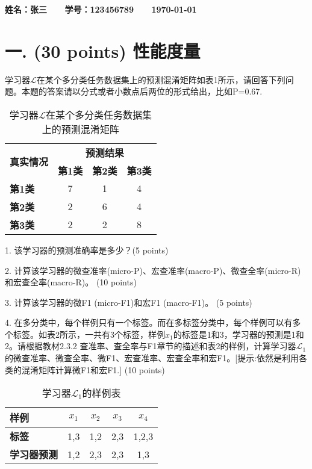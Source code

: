 \documentclass[8pt]{article}
\begin{document}
\textbf{\color{blue} \Large 姓名：张三 \ \ \ 学号：123456789 \ \ \ \today}


\section*{一. (30 points) 性能度量}
学习器$\mathcal{L}$在某个多分类任务数据集上的预测混淆矩阵如表1所示，请回答下列问题。本题的答案请以分式或者小数点后两位的形式给出，比如P=0.67.
\begin{table}[h]
\centering
\begin{tabular}{l|c|c|c}
\toprule
\multirow{2}{*}{\textbf{真实情况}}  & \multicolumn{3}{c}{\textbf{预测结果}} \\
\cmidrule(lr){2-4} & \textbf{第1类} & \textbf{第2类} & \textbf{第3类}\\
\midrule
\textbf{第1类}& 7 & 1 & 4\\
\midrule
\textbf{第2类}& 2 & 6 & 4  \\
\midrule
\textbf{第3类} &2  & 2 & 8 \\
\bottomrule
\end{tabular}
\caption{学习器$\mathcal{L}$在某个多分类任务数据集上的预测混淆矩阵}
\end{table}

1. 该学习器的预测准确率是多少？(5 points)

2. 计算该学习器的微查准率(micro-P)、宏查准率(macro-P)、微查全率(micro-R) 和宏查全率(macro-R)。 (10 points)

3. 计算该学习器的微F1 (micro-F1)和宏F1 (macro-F1)。 (5 points)

4. 在多分类中，每个样例只有一个标签。而在多标签分类中，每个样例可以有多个标签。如表2所示，一共有3个标签，样例$x_1$的标签是1和3，学习器的预测是1和2。请根据教材2.3.2 查准率、查全率与F1章节的描述和表2的样例，计算学习器$\mathcal{L}_1$的微查准率、微查全率、微F1、宏查准率、宏查全率和宏F1。[提示:依然是利用各类的混淆矩阵计算微F1和宏F1.] (10 points)


\begin{table}[h]
\centering
\begin{tabular}{l|c|c|c|c}
\toprule
\textbf{样例}& $x_1$ & $x_2$ & $x_3$ & $x_4$\\
\midrule
\textbf{标签} & 1,3 & 1,2 & 2,3 & 1,2,3 \\
\midrule
\textbf{学习器预测} & 1,2    & 2,3 & 2,3 & 1,3\\
\bottomrule
\end{tabular}
\caption{学习器$\mathcal{L}_1$的样例表}
\end{table}
\end{document}
